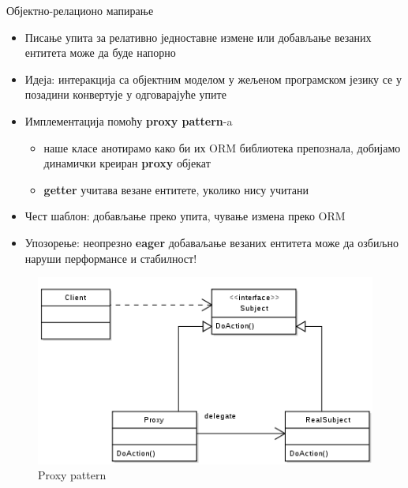 \documentclass[aspectratio=169]{beamer}
\begin{document}
    \begin{frame}[allowframebreaks]{Објектно-релационо мапирање}
        \begin{itemize}
            \item Писање упита за релативно једноставне измене или добављање везаних ентитета може да буде напорно
            \item Идеја: интеракција са објектним моделом у жељеном програмском језику се у позадини конвертује у одговарајуће упите
            \item Имплементација помоћу \textbf{proxy pattern}-a
            \begin{itemize}
                \item наше класе анотирамо како би их ORM библиотека препознала, добијамо динамички креиран \textbf{proxy} објекат
                \item \textbf{getter} учитава везане ентитете, уколико нису учитани
            \end{itemize}
            \item Чест шаблон: добављање преко упита, чување измена преко ORM
            \item Упозорење: неопрезно \textbf{eager} добаваљање везаних ентитета може да озбиљно наруши перформансе и стабилност!          
        \end{itemize}
        
        \framebreak
        
        \begin{figure}
            \centering
            \includegraphics[width=\textwidth,height=0.7\textheight,keepaspectratio]{images/proxy.png}
            \caption{Proxy pattern}
            \label{fig:proxy}
        \end{figure}
        
        \framebreak
        

\end{frame}
\end{document}
